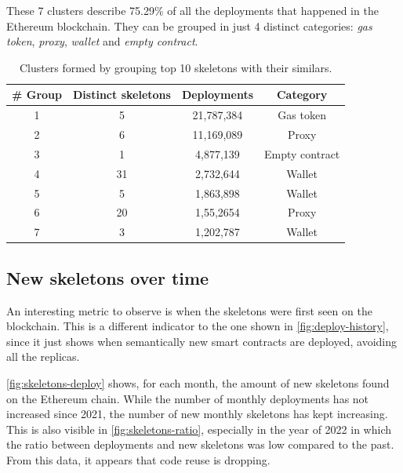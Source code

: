 These 7 clusters describe 75.29\% of all the deployments that happened in the Ethereum blockchain. They can be grouped in just 4 distinct categories: \textit{gas token}, \textit{proxy}, \textit{wallet} and \textit{empty contract}.

\begin{table}[H]
\centering
    \begin{threeparttable}
    \begin{tabular}{ c c c c } 
    \toprule
    \textbf{\# Group} & \textbf{Distinct skeletons} & \textbf{Deployments} & \textbf{Category} \\
    \midrule  
    1 & 5 & 21,787,384 & Gas token \\ [1.2ex]
    2 & 6 & 11,169,089 & Proxy \\ [1.2ex]
    3 & 1 & 4,877,139 & Empty contract \\ [1.2ex]
    4 & 31 & 2,732,644 & Wallet \\ [1.2ex]
    5 & 5 & 1,863,898 & Wallet \\ [1.2ex]
    6 & 20 & 1,55,2654 & Proxy \\ [1.2ex]
    7 & 3 & 1,202,787 & Wallet \\ [1.2ex]
    \bottomrule
    \end{tabular}
    \end{threeparttable}
    \caption{Clusters formed by grouping top 10 skeletons with their similars.}
    \label{table:top-skeletons-clusters}
\end{table}

\subsection{New skeletons over time}

An interesting metric to observe is when the skeletons were first seen on the blockchain. This is a different indicator to the one shown in \cref{fig:deploy-history}, since it just shows when semantically new smart contracts are deployed, avoiding all the replicas.

\cref{fig:skeletons-deploy} shows, for each month, the amount of new skeletons found on the Ethereum chain. While the number of monthly deployments has not increased since 2021, the number of new monthly skeletons has kept increasing. This is also visible in \cref{fig:skeletons-ratio}, especially in the year of 2022 in which the ratio between deployments and new skeletons was low compared to the past. From this data, it appears that code reuse is dropping. 

